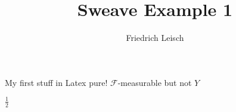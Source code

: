 \documentclass[a4paper]{article}
\title{Sweave Example 1}
\author{Friedrich Leisch}
\begin{document}
\maketitle

My first stuff in Latex pure!
$\mathcal{F}$-measurable but not $Y$







$\frac{1}{2}$
\end{document}
